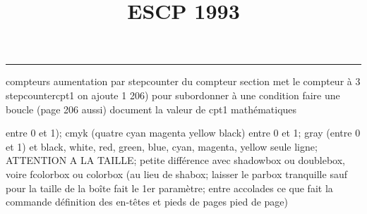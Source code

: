 \documentclass[11pt]{article}%
\title{\bf \vspace{-2cm} ESCP 1993} %
\author{} %
\date{} %
\renewcommand{\headrulewidth}{0pt}%
\renewcommand{\footrulewidth}{0.4pt}%
\begin{document}
\maketitle %
\vspace{-1.4cm}\hrule %
\thispagestyle{fancy}

\vspace*{.2cm}



compteurs%
aumentation par stepcounter du compteur section%
met le compteur à 3%
stepcounter{cpt1} on ajoute 1%
206) pour subordonner à une condition %
faire une boucle (page 206 aussi) %
document la valeur de cpt1 
mathématiques\newcommand{\ch}{\operatorname{ch}} 
\newcommand{\sh}{\operatorname{sh}}
\renewcommand{\tanh}{\operatorname{th}}
\renewcommand{\sinh}{\operatorname{sh}}
\renewcommand{\cosh}{\operatorname{ch}}
\newcommand{\argsh}{\operatorname{argsh}}
\newcommand{\argch}{\operatorname{argch}}
\newcommand{\argth}{\operatorname{argth}}
\newcommand{\ker}{\operatorname{Ker}}
\renewcommand{\im}{\operatorname{Im}}
\newcommand{\rg}{\operatorname{rg}}
\newcommand{\Id}{\operatorname{Id}}
\newcommand{\id}{\operatorname{id}}
\renewcommand{\leq}{\leq}
\renewcommand{\geq}{\geq }

entre 0 et 1); cmyk (quatre cyan magenta yellow black) entre 0 et 1;
gray (entre 0 et 1) et black, white, red, green, blue, cyan, magenta,
yellow%
seule ligne; ATTENTION A LA TAILLE; petite différence avec shadowbox ou
doublebox, voire fcolorbox ou colorbox (au lieu de shabox; laisser le
parbox tranquille sauf pour la taille de la boîte
\newcommand{\Tbox}[1]{\begin{center} \shabox{\parbox{0.6
\linewidth}{#1}} \end{center}} %
fait le 1er paramètre; entre accolades ce que fait la commande
définition des en-têtes et pieds de pages\pagestyle{fancy}
\chead{}
\rfoot[ \ \thepage]{\thepage}
\cfoot{}
\lfoot{}
\thispagestyle{fancy} %
pied de page)\renewcommand{\footrulewidth}{0.4pt}
\renewcommand{\headrulewidth}{0.4pt}
\end{document}
